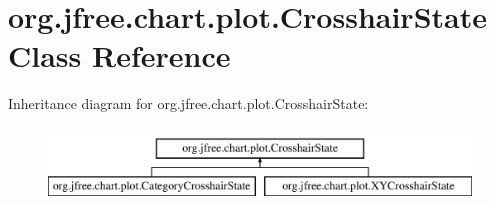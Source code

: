 \hypertarget{classorg_1_1jfree_1_1chart_1_1plot_1_1_crosshair_state}{}\section{org.\+jfree.\+chart.\+plot.\+Crosshair\+State Class Reference}
\label{classorg_1_1jfree_1_1chart_1_1plot_1_1_crosshair_state}
Inheritance diagram for org.\+jfree.\+chart.\+plot.\+Crosshair\+State\+:\begin{figure}[H]
\begin{center}
\leavevmode
\includegraphics[height=2.000000cm]{classorg_1_1jfree_1_1chart_1_1plot_1_1_crosshair_state}
\end{center}
\end{figure}
